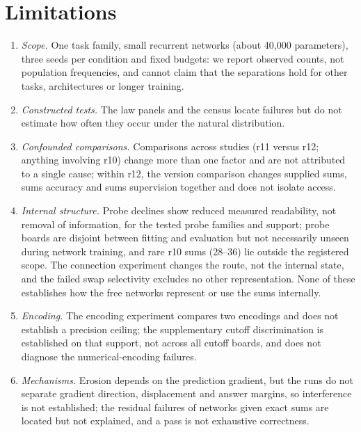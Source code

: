 \section{Limitations}\label{sec:limitations}

\begin{enumerate}
\item \emph{Scope.} One task family, small recurrent networks (about 40,000
  parameters), three seeds per condition and fixed budgets: we report
  observed counts, not population frequencies, and cannot claim that the
  separations hold for other tasks, architectures or longer training.
\item \emph{Constructed tests.} The law panels and the census locate failures
  but do not estimate how often they occur under the natural distribution.
\item \emph{Confounded comparisons.} Comparisons across studies (r11 versus
  r12; anything involving r10) change more than one factor and are not
  attributed to a single cause; within r12, the version comparison changes
  supplied sums, sums accuracy and sums supervision together and does not
  isolate access.
\item \emph{Internal structure.} Probe declines show reduced measured
  readability, not removal of information, for the tested probe families and
  support; probe boards are disjoint between fitting and evaluation but not
  necessarily unseen during network training, and rare r10 sums (28--36) lie
  outside the registered scope. The connection experiment changes the route,
  not the internal state, and the failed swap selectivity excludes no other
  representation. None of these establishes how the free networks represent
  or use the sums internally.
\item \emph{Encoding.} The encoding experiment compares two encodings and
  does not establish a precision ceiling; the supplementary cutoff
  discrimination is established on that support, not across all cutoff
  boards, and does not diagnose the numerical-encoding failures.
\item \emph{Mechanisms.} Erosion depends on the prediction gradient, but the
  runs do not separate gradient direction, displacement and answer margins,
  so interference is not established; the residual failures of networks
  given exact sums are located but not explained, and a pass is not
  exhaustive correctness.
\end{enumerate}
